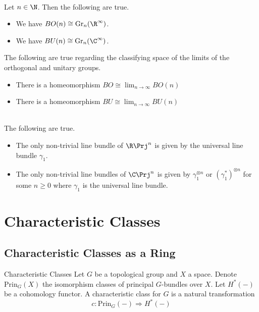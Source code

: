 \documentclass[a4paper]{article}
\begin{document}
\begin{prp}{}{}\\
Let $n\in\N$. Then the following are true. 
\begin{itemize}
\item We have $BO(n)\cong\text{Gr}_n(\R^\infty)$. 
\item We have $BU(n)\cong\text{Gr}_n(\C^\infty)$. 
\end{itemize}
\end{prp}

\begin{prp}{}{} The following are true regarding the classifying space of the limits of the orthogonal and unitary groups. 
\begin{itemize}
\item There is a homeomorphism $BO\cong\lim_{n\to\infty}BO(n)$
\item There is a homeomorphism $BU\cong\lim_{n\to\infty}BU(n)$
\end{itemize}
\end{prp}

\begin{eg}{}{}\\
The following are true. 
\begin{itemize}
\item The only non-trivial line bundle of $\R\Prj^n$ is given by the universal line bundle $\gamma_1$. 
\item The only non-trivial line bundles of $\C\Prj^n$ is given by $\gamma_1^{\otimes n}$ or $(\gamma_1^\ast)^{\otimes n}$ for some $n\geq 0$ where $\gamma_1$ is the universal line bundle. 
\end{itemize}
\end{eg}

\pagebreak
\section{Characteristic Classes}
\subsection{Characteristic Classes as a Ring}
\begin{defn}{Characteristic Classes}{} Let $G$ be a topological group and $X$ a space. Denote $\text{Prin}_G(X)$ the isomorphism classes of principal $G$-bundles over $X$. Let $H^\ast(-)$ be a cohomology functor. A characteristic class for $G$ is a natural transformation $$c:\text{Prin}_G(-)\Rightarrow H^\ast(-)$$
\end{defn}
\end{document}
